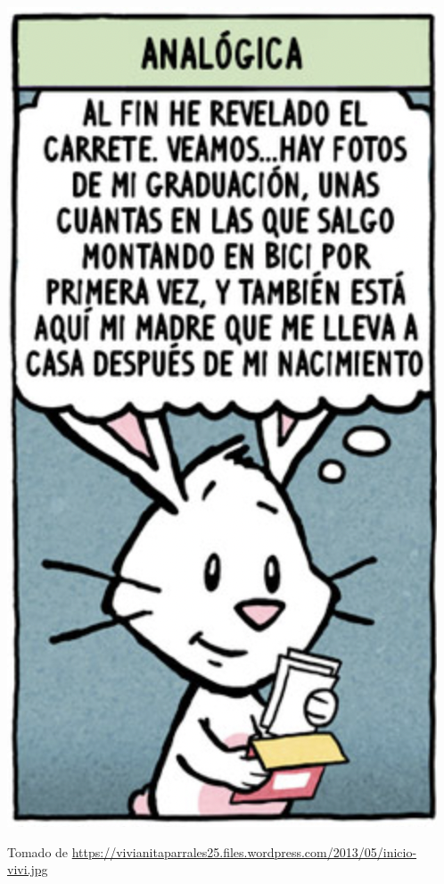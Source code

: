 \documentclass[
10pt, %
aspectratio=169, %
]{beamer}
\begin{document}
\begin{frame}
\begin{minipage}{.5\textwidth}
		\end{minipage}%
		\begin{minipage}{.55\textwidth}
			\centering
			\includegraphics[scale=0.43]{analogica.png} 
				
			{\scriptsize Tomado de \url{https://vivianitaparrales25.files.wordpress.com/2013/05/inicio-vivi.jpg}}
		\end{minipage}
		
	\end{frame}
	
\end{document}
